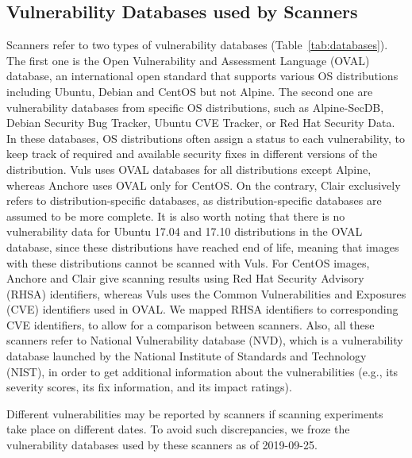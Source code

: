 \subsection{Vulnerability Databases used by Scanners}

Scanners refer to two types of
vulnerability databases (Table~\ref{tab:databases}). The first one is the Open Vulnerability and
Assessment Language (OVAL) database, an international open standard that
supports various OS distributions including Ubuntu, Debian and CentOS but
not Alpine. The second one are vulnerability databases from specific OS
distributions, such as Alpine-SecDB, Debian Security Bug Tracker, Ubuntu
CVE Tracker, or Red Hat Security Data. In these databases, OS distributions often assign a
status to each vulnerability, to keep track of required and available
security fixes in different versions of the distribution. Vuls uses OVAL
databases for all distributions except Alpine, whereas Anchore uses OVAL only for CentOS. 
On the contrary, Clair exclusively refers to
distribution-specific databases, as distribution-specific databases
are assumed to be more complete.
It is also worth noting that there is no vulnerability data
for Ubuntu 17.04 and 17.10 distributions in the OVAL database, since these
distributions have reached end of life, meaning that images with these
distributions cannot be scanned with Vuls.
For CentOS images, Anchore and Clair give scanning results using Red Hat
Security Advisory (RHSA) identifiers, whereas Vuls uses the Common
Vulnerabilities and Exposures (CVE) identifiers used in OVAL. We mapped
RHSA identifiers to corresponding CVE identifiers, to allow for a
comparison between scanners. Also, all these scanners refer to
National Vulnerability database (NVD), which is a vulnerability database 
launched by the National Institute of Standards and Technology (NIST),
in order to get additional information about the vulnerabilities (e.g.,
its severity scores, its fix information, and its impact ratings).

Different vulnerabilities may be reported by scanners if scanning
experiments take place on different dates. To avoid such discrepancies, we
froze the vulnerability databases used by these scanners as of 2019-09-25.

